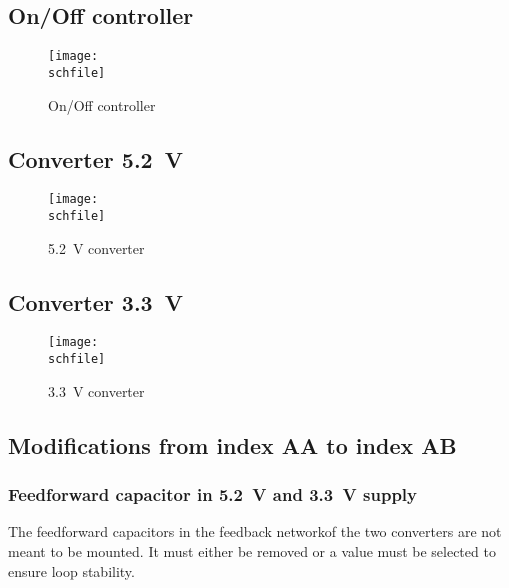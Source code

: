 \FloatBarrier

\subsection{On/Off controller}
\label{sec_onoff}

\begin{figure}[h!]
    \centering
    \texttt{[image: \\schfile]}
    \caption{On/Off controller}
    \label{fig_onoff}
\end{figure}

\FloatBarrier

\subsection{Converter \SI{5.2}{\volt}}
\label{sec_power_5V2}

\begin{figure}[h!]
    \centering
    \texttt{[image: \\schfile]}
    \caption{\SI{5.2}{\volt} converter}
    \label{fig_power_5V2}
\end{figure}

\FloatBarrier

\subsection{Converter \SI{3.3}{\volt}}
\label{sec_power_3V3}

\begin{figure}[h!]
    \centering
    \texttt{[image: \\schfile]}
    \caption{\SI{3.3}{\volt} converter}
    \label{fig_power_3V3}
\end{figure}

\FloatBarrier

\subsection{Modifications from index AA to index AB}

\subsubsection{Feedforward capacitor in \SI{5.2}{\volt} and \SI{3.3}{\volt} supply}
The feedforward capacitors in the feedback networkof the two converters are not meant to be mounted. It must either be removed or a value must be selected to ensure loop stability. 

